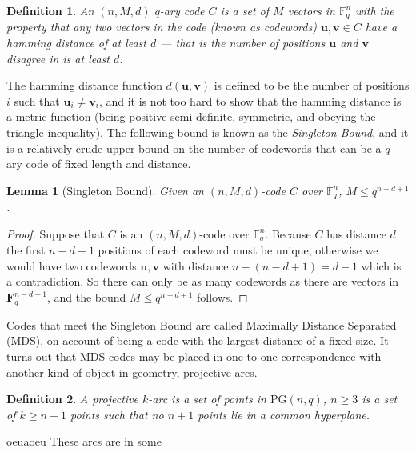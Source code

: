 \documentclass{article}
\newtheorem{lemma}{Lemma}
\newtheorem{definition}{Definition}
\newcommand{\PG}{\mathrm{PG}}
\begin{document}
\begin{definition}
  An \((n, M, d)\) \(q\)-ary code \(C\) is a set of \(M\) vectors in \(\mathbb{F}_{q}^{n}\) with the property that any two vectors in the code (known as \textit{codewords}) \(\mathbf{u}, \mathbf{v} \in C\) have a \textit{hamming distance} of at least \(d\) --- that is the number of positions \(\mathbf{u}\) and \(\mathbf{v}\) disagree in is at least \(d\).
\end{definition}

The hamming distance function \(d(\mathbf{u}, \mathbf{v})\) is defined to be the number of positions \(i\) such that \(\mathbf{u}_{i} \neq \mathbf{v}_{i}\), and it is not too hard to show that the hamming distance is a metric function (being positive semi-definite, symmetric, and obeying the triangle inequality).
The following bound is known as the \textit{Singleton Bound}, and it is a relatively crude upper bound on the number of codewords that can be a \(q\)-ary code of fixed length and distance.

\begin{lemma}[Singleton Bound]
  Given an \((n, M, d)\)-code \(C\) over \(\mathbb{F}_{q}^{n}\), \(M \leq q^{n - d + 1}\).
\end{lemma}

\begin{proof}
  Suppose that \(C\) is an \((n, M, d)\)-code over \(\mathbb{F}_{q}^{n}\). Because \(C\) has distance \(d\) the first \(n - d + 1\) positions of each codeword must be unique, otherwise we would have two codewords \(\mathbf{u}, \mathbf{v}\) with distance \(n - (n - d + 1) = d - 1\) which is a contradiction.
  So there can only be as many codewords as there are vectors in \(\mathbf{F}_{q}^{n - d + 1}\), and the bound \(M \leq q^{n - d + 1}\) follows.
\end{proof}

Codes that meet the Singleton Bound are called Maximally Distance Separated (MDS), on account of being a code with the largest distance of a fixed size. It turns out that MDS codes may be placed in one to one correspondence with another kind of object in geometry, projective arcs.

\begin{definition}
  A projective \(k\)-arc is a set of points in \(\PG(n, q)\), \(n \geq 3\) is a set of \(k \geq n + 1\) points such that no \(n + 1\) points lie in a common hyperplane.
\end{definition}
oeuaoeu
These arcs are in some
\end{document}
